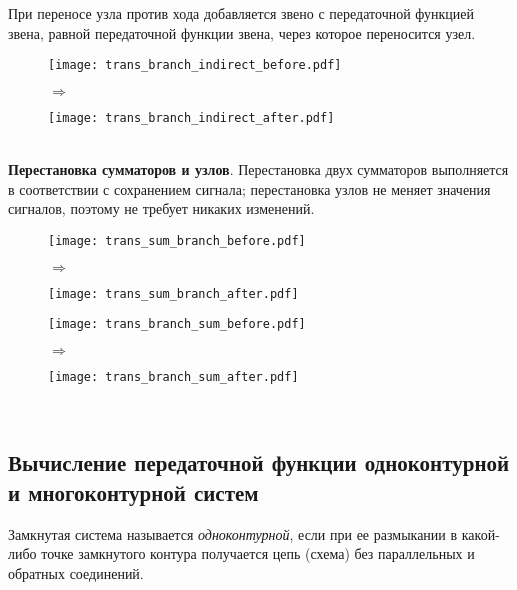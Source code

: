 \documentclass[../../TAU.tex]{subfiles}
\begin{document}
    При переносе узла против хода  добавляется звено с передаточной функцией звена, равной передаточной функции звена, через которое переносится узел. 
    \begin{figure}[h]
        \begin{minipage}[h]{0.45\linewidth}
            \texttt{[image: trans\_branch\_indirect\_before.pdf]}
        \end{minipage}
        $\Longrightarrow$
        \begin{minipage}[h]{0.45\linewidth}
            \texttt{[image: trans\_branch\_indirect\_after.pdf]}
        \end{minipage}
    \end{figure}\\
    {\bf Перестановка сумматоров и узлов}. Перестановка двух сумматоров выполняется в соответствии с сохранением сигнала; перестановка узлов не меняет значения сигналов, поэтому не требует никаких изменений.
    \begin{figure}[h]
        \begin{minipage}[h]{0.45\linewidth}
            \texttt{[image: trans\_sum\_branch\_before.pdf]}
        \end{minipage}
        $\Longrightarrow$
        \begin{minipage}[h]{0.45\linewidth}
            \texttt{[image: trans\_sum\_branch\_after.pdf]}
        \end{minipage}
    \end{figure}
    \begin{figure}[h]
        \begin{minipage}[h]{0.45\linewidth}
            \texttt{[image: trans\_branch\_sum\_before.pdf]}
        \end{minipage}
    $\Longrightarrow$
        \begin{minipage}[h]{0.45\linewidth}
            \texttt{[image: trans\_branch\_sum\_after.pdf]}
        \end{minipage}
    \end{figure}\\

\subsection{Вычисление передаточной функции одноконтурной и многоконтурной систем}

     Замкнутая система называется {\it одноконтурной}, если при ее размыкании в какой-либо точке замкнутого контура получается цепь (схема) без параллельных и обратных соединений.
\end{document}
